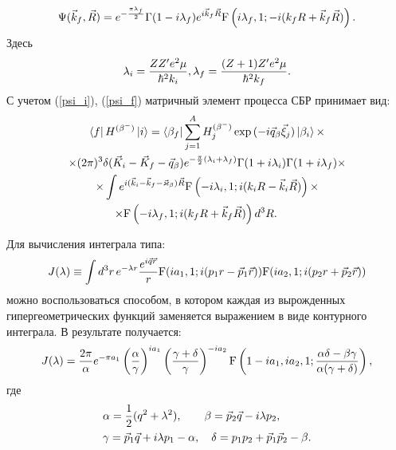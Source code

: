 \documentclass[14pt, a4paper]{article}
\numberwithin{figure}{section}
\numberwithin{equation}{section}
\begin{document}
\begin{eqnarray}\label{psi_f}
\Psi (\vec k_f, \vec R)=e^{-{\pi \lambda_f\over2}} \Gamma(1-i\lambda_f)
e^{i \vec k_f \vec R} {\rm F} \left(i \lambda_f,1;-i(k_f R + \vec k_f \vec R)\right).
\end{eqnarray}
Здесь
\begin{eqnarray}
\lambda_i = {Z Z' e^2 \mu\over \hbar^2 k_i},
\lambda_f = {(Z+1) Z' e^2 \mu\over \hbar^2 k_f}.
\end{eqnarray}
С учетом (\ref{psi_i}), (\ref{psi_f}) матричный элемент процесса СБР принимает вид:
\begin{multline}\label{pred_mat}
\bra{f} H^{(\beta^-)}\ket{i}= \bra{\beta_f }
\sum_{j=1}^A H^{(\beta^-)}_{j}\exp{(-i\vec q_\beta\vec\xi_{j})}
\ket{ \beta_i}\times \\
\times(2\pi)^3 \delta (\vec K_i - \vec K_f - \vec q_\beta)
e^{-{\pi\over 2} (\lambda_i + \lambda_f)} \Gamma{(1+i\lambda_i)}
\Gamma{(1+i\lambda_f)}\times\\
\times\int e^{i(\vec k_i - \vec k_f - \vec \varkappa_\beta)\vec R}
{\rm F} \left(-i \lambda_i,1;i(k_i R - \vec k_i \vec R)\right)\times\\
\times{\rm F} \left(-i \lambda_f,1;i(k_f R + \vec k_f \vec R)\right) d^3 R .\qquad
\end{multline}

Для вычисления интеграла типа:
\begin{equation}\label{def_J}
J(\lambda)\equiv\int d^3 r\, e^{-\lambda r} {e^{i\vec q \vec r}\over r}
{\rm F} (i a_1,1;i(p_1 r - \vec p_1 \vec r))
{\rm F} (i a_2,1;i(p_2 r + \vec p_2 \vec r))
\end{equation}
можно воспользоваться способом, в котором каждая из вырожденных гипергеометрических функций
заменяется выражением в виде контурного интеграла. В результате
получается:
\begin{equation}\label{rez_J}
J(\lambda)={{2\pi}\over\alpha} e^{-\pi a_1}\left({\alpha\over\gamma}\right)^{i a_1}
\left({{\gamma+\delta}\over\gamma}\right)^{-i a_2}{\rm F}\left(1-i a_1, i a_2,
1;{{\alpha\delta-\beta\gamma}\over{\alpha(\gamma+\delta)}}\right),
\end{equation}
где
\begin{equation*}
\begin{split}
&\alpha={1\over2}(q^2+\lambda^2),\qquad \beta=\vec p_2 \vec q - i \lambda p_2,
\\
&\gamma=\vec p_1 \vec q + i \lambda p_1 - \alpha, \quad \delta=p_1 p_2+
\vec p_1 \vec p_2 -\beta.
\end{split}
\end{equation*}
\end{document}
